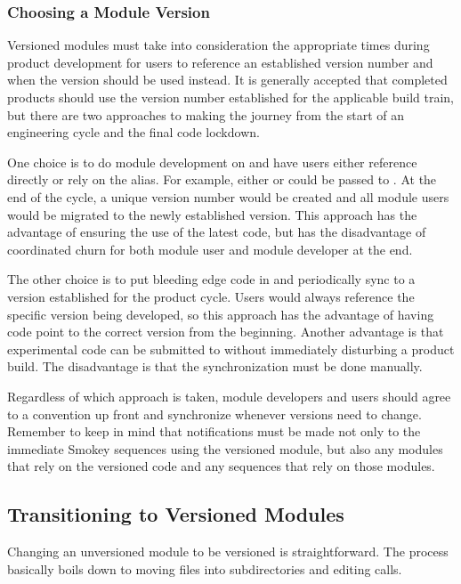 \subsubsection{Choosing a Module Version}

Versioned modules must take into consideration the appropriate times during
product development for users to reference an established version number and
when the  version should be used instead.  It is generally
accepted that completed products should use the version number established for
the applicable build train, but there are two approaches to making the journey
from the start of an engineering cycle and the final code lockdown.

One choice is to do module development on  and have users
either reference  directly or rely on the alias.  For example,
either  or  could be passed to
.  At the end of the cycle, a unique version number would be
created and all module users would be migrated to the newly established
version.  This approach has the advantage of ensuring the use of the latest
code, but has the disadvantage of coordinated churn for both module user and
module developer at the end.

The other choice is to put bleeding edge code in  and
periodically sync  to a version established for the product
cycle.  Users would always reference the specific version being developed, so
this approach has the advantage of having code point to the correct version
from the beginning.  Another advantage is that experimental code can be
submitted to  without immediately disturbing a product build.
The disadvantage is that the synchronization must be done manually.

Regardless of which approach is taken, module developers and users should agree
to a convention up front and synchronize whenever versions need to change.
Remember to keep in mind that notifications must be made not only to the
immediate Smokey sequences using the versioned module, but also any modules
that rely on the versioned code and any sequences that rely on those modules.

\subsection{Transitioning to Versioned Modules}

Changing an unversioned module to be versioned is straightforward.   The
process basically boils down to moving files into subdirectories and editing
 calls.

